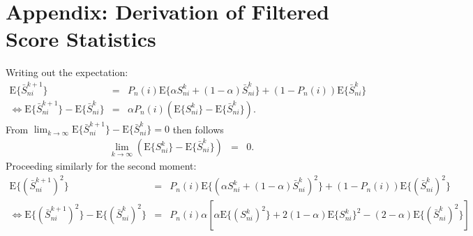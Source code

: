 
\section*{Appendix: Derivation of Filtered Score Statistics}

Writing out the expectation:
\begin{eqnarray}
\text{E}\{\bar{S}_{ni}^{k+1}\} & = & P_{n}(i)\text{E}\{\alpha S_{ni}^{k}+(1-\alpha)\bar{S}_{ni}^{k}\}+(1-P_{n}(i))\text{E}\{\bar{S}_{ni}^{k}\}\\
\Leftrightarrow\text{E}\{\bar{S}_{ni}^{k+1}\}-\text{E}\{\bar{S}_{ni}^{k}\} & = & \alpha P_{n}(i)(\text{E}\{S_{ni}^{k}\}-\text{E}\{\bar{S}_{ni}^{k}\}).
\end{eqnarray}
From $\lim_{k\rightarrow\infty}\text{E}\{\bar{S}_{ni}^{k+1}\}-\text{E}\{\bar{S}_{ni}^{k}\}=0$
then follows
\begin{eqnarray}
\lim_{k\rightarrow\infty}\left(\text{E}\{S_{ni}^{k}\}-\text{E}\{\bar{S}_{ni}^{k}\}\right) & = & 0. \label{eq:first-score-moment}
\end{eqnarray}
%
Proceeding similarly for the second moment:
\begin{eqnarray}
\text{E}\{(\bar{S}_{ni}^{k+1})^{2}\} 
& = & 
P_{n}(i)\text{E}\{(\alpha S_{ni}^{k}+(1-\alpha)\bar{S}_{ni}^{k})^{2}\}+(1-P_{n}(i))\text{E}\{(\bar{S}_{ni}^{k})^{2}\}\\
\Leftrightarrow
\text{E}\{(\bar{S}_{ni}^{k+1})^{2}\}-\text{E}\{(\bar{S}_{ni}^{k})^{2}\} 
& = & P_{n}(i) \alpha \left[\alpha\text{E}\{(S_{ni}^{k})^{2}\}+2(1-\alpha)\text{E}\{S_{ni}^{k}\}^{2}-(2-\alpha)\text{E}\{(\bar{S}_{ni}^{k})^{2}\}\right]
\end{eqnarray}

